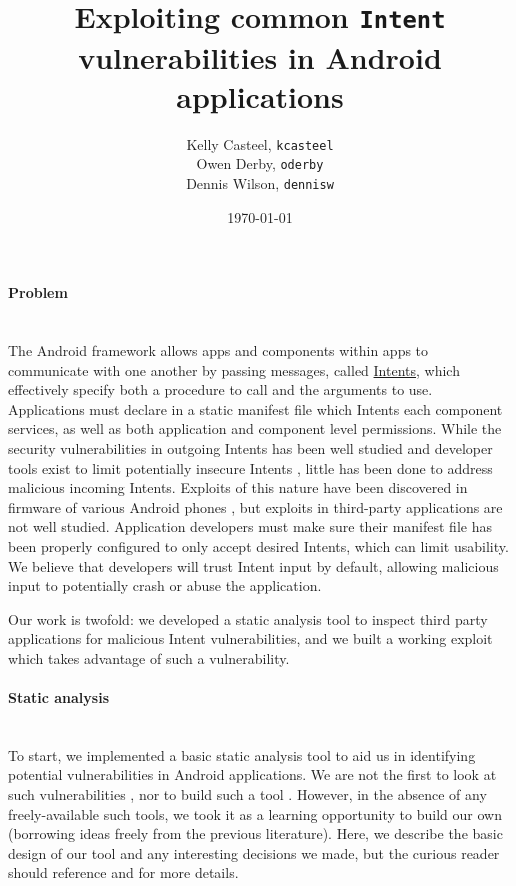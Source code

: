 \documentclass[12pt,a4paper]{article}
\title{Exploiting common \texttt{Intent} vulnerabilities in Android %
applications}
\date{\today}
\author{Kelly Casteel, \texttt{kcasteel}\\Owen Derby, \texttt{oderby}\\Dennis
 Wilson, \texttt{dennisw}}
\begin{document}
 

\maketitle

\paragraph{Problem} ~\\
The Android framework allows apps and components within apps to communicate with
one another by passing messages, called
\href{https://developer.android.com/reference/android/content/Intent.html}{Intents},
which effectively specify both a procedure to call and the arguments to
use. Applications must declare in a static manifest file which Intents each
component services, as well as both application and component level
permissions. While the security vulnerabilities in outgoing Intents has been
well studied \cite{chin_analyzing_2011} and developer tools exist to limit
potentially insecure Intents \cite{lu_chex_2012}, little has been done to
address malicious incoming Intents. Exploits of this nature have been discovered
in firmware of various Android phones \cite{grace_systematic_2012}, but exploits
in third-party applications are not well studied. Application developers must
make sure their manifest file has been properly configured to only accept
desired Intents, which can limit usability. We believe that developers will
trust Intent input by default, allowing malicious input to potentially crash or
abuse the application.

Our work is twofold: we developed a static analysis tool to inspect third party
applications for malicious Intent vulnerabilities, and we built a working
exploit which takes advantage of such a vulnerability.

\paragraph{Static analysis} ~\\
To start, we implemented a basic static analysis tool to aid us in identifying
potential vulnerabilities in Android applications. We are not the first to look
at such vulnerabilities \cite{chin_analyzing_2011}, nor to build such a tool
\cite{grace_systematic_2012}. However, in the absence of any freely-available
such tools, we took it as a learning opportunity to build our own (borrowing
ideas freely from the previous literature). Here, we describe the basic design
of our tool and any interesting decisions we made, but the curious reader should
reference \cite{chin_analyzing_2011} and \cite{grace_systematic_2012} for more
details.
\end{document}
